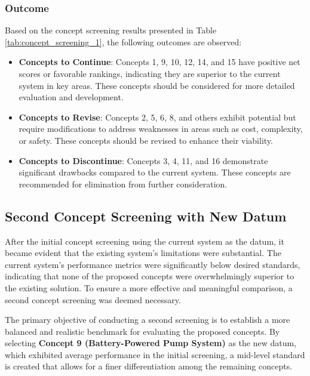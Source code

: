 \documentclass[12pt]{article}
\begin{document}
\subsubsection{Outcome}
\label{subsubsec:concept_screening_outcome}

Based on the concept screening results presented in Table \ref{tab:concept_screening_1}, the following outcomes are observed:

\begin{itemize}
    \item \textbf{Concepts to Continue}: Concepts 1, 9, 10, 12, 14, and 15 have positive net scores or favorable rankings, indicating they are superior to the current system in key areas. These concepts should be considered for more detailed evaluation and development.
    
    \item \textbf{Concepts to Revise}: Concepts 2, 5, 6, 8, and others exhibit potential but require modifications to address weaknesses in areas such as cost, complexity, or safety. These concepts should be revised to enhance their viability.
    
    \item \textbf{Concepts to Discontinue}: Concepts 3, 4, 11, and 16 demonstrate significant drawbacks compared to the current system. These concepts are recommended for elimination from further consideration.
\end{itemize}

\subsection{Second Concept Screening with New Datum}
\label{subsec:second_concept_screening}


After the initial concept screening using the current system as the datum, it became evident that the existing system's limitations were substantial. The current system's performance metrics were significantly below desired standards, indicating that none of the proposed concepts were overwhelmingly superior to the existing solution. To ensure a more effective and meaningful comparison, a second concept screening was deemed necessary.


The primary objective of conducting a second screening is to establish a more balanced and realistic benchmark for evaluating the proposed concepts. By selecting \textbf{Concept 9 (Battery-Powered Pump System)} as the new datum, which exhibited average performance in the initial screening, a mid-level standard is created that allows for a finer differentiation among the remaining concepts. 
\end{document}
